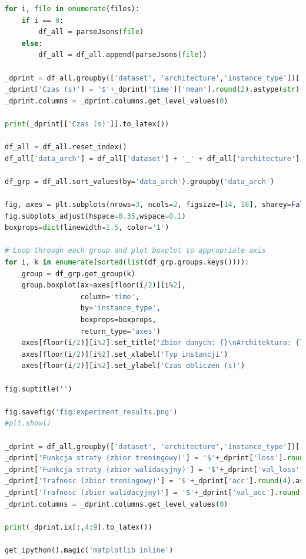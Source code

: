 \documentclass[12pt,a4paper,twoside]{article}
\begin{document}
\begin{appendices}
\begin{lstlisting}[language=python]
for i, file in enumerate(files):
    if i == 0:
        df_all = parseJsons(file)
    else:
        df_all = df_all.append(parseJsons(file))

_dprint = df_all.groupby(['dataset', 'architecture','instance_type'])['time','loss'].aggregate({'time' : [np.mean, np.std], 'loss' : ['min']})
_dprint['Czas (s)'] = '$'+_dprint['time']['mean'].round(2).astype(str)+'+/-'+_dprint['time']['std'].round(2).astype(str)+'$'
_dprint.columns = _dprint.columns.get_level_values(0)

print(_dprint[['Czas (s)']].to_latex())

df_all = df_all.reset_index()
df_all['data_arch'] = df_all['dataset'] + '_' + df_all['architecture']

df_grp = df_all.sort_values(by='data_arch').groupby('data_arch')

fig, axes = plt.subplots(nrows=3, ncols=2, figsize=[14, 18], sharey=False)
fig.subplots_adjust(hspace=0.35,wspace=0.1)
boxprops=dict(linewidth=1.5, color='1')

# Loop through each group and plot boxplot to appropriate axis
for i, k in enumerate(sorted(list(df_grp.groups.keys()))):
    group = df_grp.get_group(k)
    group.boxplot(ax=axes[floor(i/2)][i%2],
                  column='time',
                  by='instance_type',
                  boxprops=boxprops,
                  return_type='axes')
    axes[floor(i/2)][i%2].set_title('Zbior danych: {}\nArchitektura: {}'.format(k.split('_')[0], k.split('_')[1]))
    axes[floor(i/2)][i%2].set_xlabel('Typ instancji')
    axes[floor(i/2)][i%2].set_ylabel('Czas obliczen (s)')

fig.suptitle('')

fig.savefig('fig:experiment_results.png')
#plt.show()

_dprint = df_all.groupby(['dataset', 'architecture','instance_type'])['loss','val_loss'].aggregate({'acc' : ['max'], 'val_acc' : ['max'], 'loss' : ['min'], 'val_loss' : ['min']})
_dprint['Funkcja straty (zbior treningowy)'] = '$'+_dprint['loss'].round(4).astype(str)+'$'
_dprint['Funkcja straty (zbior walidacyjny)'] = '$'+_dprint['val_loss'].round(4).astype(str)+'$'
_dprint['Trafnosc (zbior treningowy)'] = '$'+_dprint['acc'].round(4).astype(str)+'$'
_dprint['Trafnosc (zbior walidacyjny)'] = '$'+_dprint['val_acc'].round(4).astype(str)+'$'
_dprint.columns = _dprint.columns.get_level_values(0)

print(_dprint.ix[:,4:9].to_latex())

get_ipython().magic('matplotlib inline')


\end{lstlisting}
\end{appendices}
\end{document}
